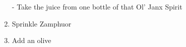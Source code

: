 \documentclass{article}
\begin{document}
\begin{enumerate}

	\item[-]{Take the juice from one bottle of
         that Ol' Janx Spirit}
	\item{Sprinkle Zamphuor}
	\item{Add an olive}

\end{enumerate}
\end{document}
